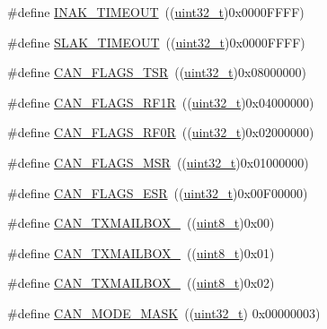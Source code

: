 \begin{DoxyCompactItemize}
\item 
\#define \hyperlink{group___c_a_n___private___defines_ga60a32132df242146efd3e9f7a079f0f0}{I\+N\+A\+K\+\_\+\+T\+I\+M\+E\+O\+UT}~((\hyperlink{_p_e___types_8h_a33594304e786b158f3fb30289278f5af}{uint32\+\_\+t})0x0000\+F\+F\+F\+F)
\item 
\#define \hyperlink{group___c_a_n___private___defines_ga1bb8107706c8b4039ac55a122f3c65bb}{S\+L\+A\+K\+\_\+\+T\+I\+M\+E\+O\+UT}~((\hyperlink{_p_e___types_8h_a33594304e786b158f3fb30289278f5af}{uint32\+\_\+t})0x0000\+F\+F\+F\+F)
\item 
\#define \hyperlink{group___c_a_n___private___defines_gac67e7d905ba11441bf9e14180805cf3a}{C\+A\+N\+\_\+\+F\+L\+A\+G\+S\+\_\+\+T\+SR}~((\hyperlink{_p_e___types_8h_a33594304e786b158f3fb30289278f5af}{uint32\+\_\+t})0x08000000)
\item 
\#define \hyperlink{group___c_a_n___private___defines_ga2a03d73273ab353c8deb3a4730431977}{C\+A\+N\+\_\+\+F\+L\+A\+G\+S\+\_\+\+R\+F1R}~((\hyperlink{_p_e___types_8h_a33594304e786b158f3fb30289278f5af}{uint32\+\_\+t})0x04000000)
\item 
\#define \hyperlink{group___c_a_n___private___defines_ga4b22b2552759778ac07825240823a45f}{C\+A\+N\+\_\+\+F\+L\+A\+G\+S\+\_\+\+R\+F0R}~((\hyperlink{_p_e___types_8h_a33594304e786b158f3fb30289278f5af}{uint32\+\_\+t})0x02000000)
\item 
\#define \hyperlink{group___c_a_n___private___defines_ga3aaa7df395ce1a90cb6e2ff3d2c4b24e}{C\+A\+N\+\_\+\+F\+L\+A\+G\+S\+\_\+\+M\+SR}~((\hyperlink{_p_e___types_8h_a33594304e786b158f3fb30289278f5af}{uint32\+\_\+t})0x01000000)
\item 
\#define \hyperlink{group___c_a_n___private___defines_ga14f7bb0b320da21443c9bd60b1f86b5d}{C\+A\+N\+\_\+\+F\+L\+A\+G\+S\+\_\+\+E\+SR}~((\hyperlink{_p_e___types_8h_a33594304e786b158f3fb30289278f5af}{uint32\+\_\+t})0x00\+F00000)
\item 
\#define \hyperlink{group___c_a_n___private___defines_gaa62f09d0693681cb7576f61c93b7cf0f}{C\+A\+N\+\_\+\+T\+X\+M\+A\+I\+L\+B\+O\+X\+\_}~((\hyperlink{_p_e___types_8h_aba7bc1797add20fe3efdf37ced1182c5}{uint8\+\_\+t})0x00)
\item 
\#define \hyperlink{group___c_a_n___private___defines_ga4e20f0aac1ac940014a6c66971890943}{C\+A\+N\+\_\+\+T\+X\+M\+A\+I\+L\+B\+O\+X\+\_}~((\hyperlink{_p_e___types_8h_aba7bc1797add20fe3efdf37ced1182c5}{uint8\+\_\+t})0x01)
\item 
\#define \hyperlink{group___c_a_n___private___defines_ga8a842aa352d72321930cc963b26bf6d7}{C\+A\+N\+\_\+\+T\+X\+M\+A\+I\+L\+B\+O\+X\+\_}~((\hyperlink{_p_e___types_8h_aba7bc1797add20fe3efdf37ced1182c5}{uint8\+\_\+t})0x02)
\item 
\#define \hyperlink{group___c_a_n___private___defines_ga79094ce5a3a2f717140e8cc9b7c161b6}{C\+A\+N\+\_\+\+M\+O\+D\+E\+\_\+\+M\+A\+SK}~((\hyperlink{_p_e___types_8h_a33594304e786b158f3fb30289278f5af}{uint32\+\_\+t}) 0x00000003)
\end{DoxyCompactItemize}


